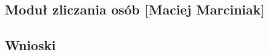 \newpage
\subsection[Moduł zliczania osób]{Moduł zliczania osób [Maciej Marciniak]}

\newpage
\subsection{Wnioski}




 
